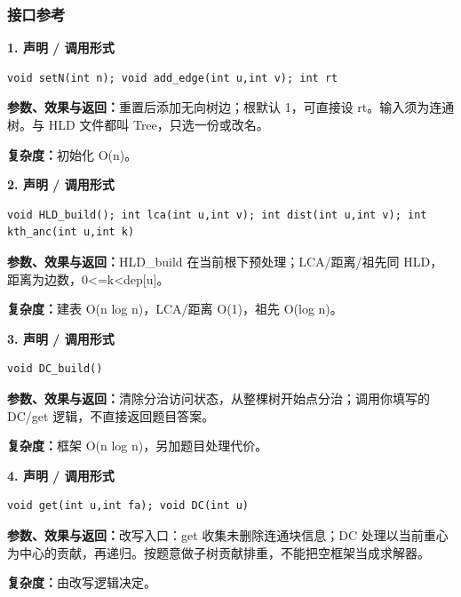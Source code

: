 \documentclass[UTF8,a4paper,10pt]{ctexart}
\begin{document}
\subsubsection*{接口参考}
\noindent\begin{minipage}{\textwidth}
\textbf{1. 声明 / 调用形式}
\begin{lstlisting}
void setN(int n); void add_edge(int u,int v); int rt
\end{lstlisting}
\textbf{参数、效果与返回：}重置后添加无向树边；根默认 1，可直接设 rt。输入须为连通树。与 HLD 文件都叫 Tree，只选一份或改名。

\textbf{复杂度：}初始化 O(n)。

\end{minipage}\par\vspace{0.4em}
\noindent\begin{minipage}{\textwidth}
\textbf{2. 声明 / 调用形式}
\begin{lstlisting}
void HLD_build(); int lca(int u,int v); int dist(int u,int v); int kth_anc(int u,int k)
\end{lstlisting}
\textbf{参数、效果与返回：}HLD\_build 在当前根下预处理；LCA/距离/祖先同 HLD，距离为边数，0<=k<dep[u]。

\textbf{复杂度：}建表 O(n log n)，LCA/距离 O(1)，祖先 O(log n)。

\end{minipage}\par\vspace{0.4em}
\noindent\begin{minipage}{\textwidth}
\textbf{3. 声明 / 调用形式}
\begin{lstlisting}
void DC_build()
\end{lstlisting}
\textbf{参数、效果与返回：}清除分治访问状态，从整棵树开始点分治；调用你填写的 DC/get 逻辑，不直接返回题目答案。

\textbf{复杂度：}框架 O(n log n)，另加题目处理代价。

\end{minipage}\par\vspace{0.4em}
\noindent\begin{minipage}{\textwidth}
\textbf{4. 声明 / 调用形式}
\begin{lstlisting}
void get(int u,int fa); void DC(int u)
\end{lstlisting}
\textbf{参数、效果与返回：}改写入口：get 收集未删除连通块信息；DC 处理以当前重心为中心的贡献，再递归。按题意做子树贡献排重，不能把空框架当成求解器。

\textbf{复杂度：}由改写逻辑决定。

\end{minipage}\par\vspace{0.4em}
\end{document}
